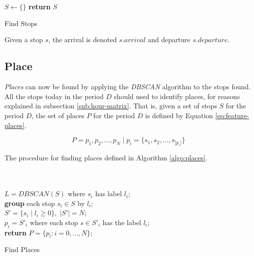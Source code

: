 \begin{algorithm}[H]
\SetAlgoLined
{}\\
\\

 $S \leftarrow \{ \}$\;
 \textbf{return} $S$\;
 \label{algo:stops}
 \caption{Find Stops}
\end{algorithm}

Given a stop $s$, the arrival is denoted $s.arrival$ and departure $s.departure$.

\subsection{Place}
\textit{Places} can now be found by applying the \textit{DBSCAN} algorithm to the stops found. All the stops today in the period $D$ should used to identify places, for reasons explained in subsection \ref{sub:hour-matrix}. That is, given a set of stops $S$ for the period $D$, the set of places $P$ for the period $D$ is defined by Equation \eqref{eq:feature-places}.

\begin{equation}
\label{eq:feature-places}
P = {p_1, p_2, ..., p_N} \;|\; p_i = \{s_1, s_2, ..., s_{|p_i|}\}
\end{equation}

The procedure for finding places defined in Algorithm \ref{algo:places}.

\begin{algorithm}[H]
\SetAlgoLined
{}\\
\\
    $L = DBSCAN(S)$ where $s_i$ has label $l_i$;\\
    \textbf{group} each stop $s_i \in S$ by $l_i$;\\
    $S' = \{s_i \;|\; l_i \geq 0\}, \;|S'| = N$;\\
    $p_i = S'_i$ where each stop $s \in S'_i$ has the label $l_i$;\\
    \textbf{return} $P = \{p_i : i = 0, ..., N\}$;\\
 \label{algo:places}
 \caption{Find Places}
\end{algorithm}

